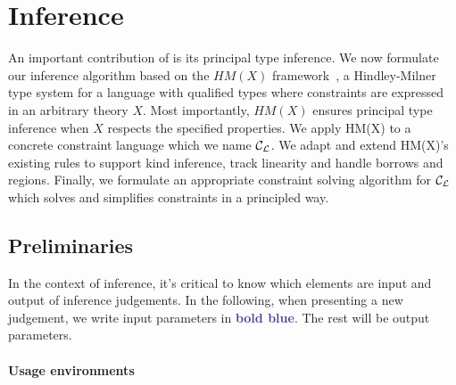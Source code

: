 \section{Inference}
\label{inference}

An important contribution of \affe is its principal type inference.
We now formulate our inference algorithm
based on the $HM(X)$ framework~\citep{DBLP:journals/tapos/OderskySW99},
a Hindley-Milner type system for a language
with qualified types where constraints are expressed in an arbitrary
theory $X$.
Most importantly,
$HM(X)$ ensures principal type inference
when $X$ respects the specified properties.
We apply HM(X) to a concrete constraint language which we name ${\mathcal C_{\mathcal L}}$.
We adapt and extend HM(X)'s existing rules to support kind inference,
track linearity and handle borrows and regions. Finally, we
formulate an appropriate constraint solving algorithm for ${\mathcal C_{\mathcal L}}$
which solves and simplifies constraints in a principled way.

\subsection{Preliminaries}

In the context of inference, it's critical to know which elements
are input and output of inference judgements.
In the following, when presenting a new judgement,
we write input parameters in \textbf{\textcolor{DarkSlateBlue}{bold blue}}. The rest will be
output parameters.

\paragraph{Usage environments}


